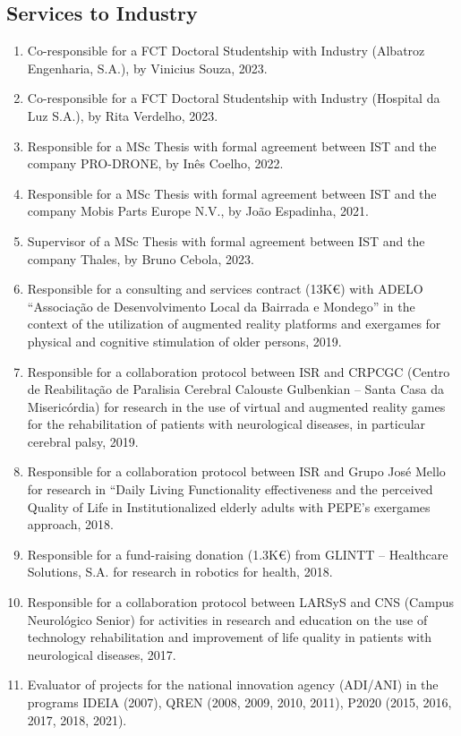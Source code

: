 \documentclass[
]{article}
\begin{document}
\subsection{Services to Industry}\label{services-to-industry}

\begin{enumerate}
\def\labelenumi{\arabic{enumi}.}
\item
  Co-responsible for a FCT Doctoral Studentship with Industry (Albatroz
  Engenharia, S.A.), by Vinicius Souza, 2023.
\item
  Co-responsible for a FCT Doctoral Studentship with Industry (Hospital
  da Luz S.A.), by Rita Verdelho, 2023.
\item
  Responsible for a MSc Thesis with formal agreement between IST and the
  company PRO-DRONE, by Inês Coelho, 2022.
\item
  Responsible for a MSc Thesis with formal agreement between IST and the
  company Mobis Parts Europe N.V., by João Espadinha, 2021.
\item
  Supervisor of a MSc Thesis with formal agreement between IST and the
  company Thales, by Bruno Cebola, 2023.
\item
  Responsible for a consulting and services contract (13K€) with ADELO
  ``Associação de Desenvolvimento Local da Bairrada e Mondego'' in the
  context of the utilization of augmented reality platforms and
  exergames for physical and cognitive stimulation of older persons,
  2019.
\item
  Responsible for a collaboration protocol between ISR and CRPCGC
  (Centro de Reabilitação de Paralisia Cerebral Calouste Gulbenkian --
  Santa Casa da Misericórdia) for research in the use of virtual and
  augmented reality games for the rehabilitation of patients with
  neurological diseases, in particular cerebral palsy, 2019.
\item
  Responsible for a collaboration protocol between ISR and Grupo José
  Mello for research in ``Daily Living Functionality effectiveness and
  the perceived Quality of Life in Institutionalized elderly adults with
  PEPE's exergames approach, 2018.
\item
  Responsible for a fund-raising donation (1.3K€) from GLINTT --
  Healthcare Solutions, S.A. for research in robotics for health, 2018.
\item
  Responsible for a collaboration protocol between LARSyS and CNS
  (Campus Neurológico Senior) for activities in research and education
  on the use of technology rehabilitation and improvement of life
  quality in patients with neurological diseases, 2017.
\item
  Evaluator of projects for the national innovation agency (ADI/ANI) in
  the programs IDEIA (2007), QREN (2008, 2009, 2010, 2011), P2020 (2015,
  2016, 2017, 2018, 2021).
\end{enumerate}
\end{document}
